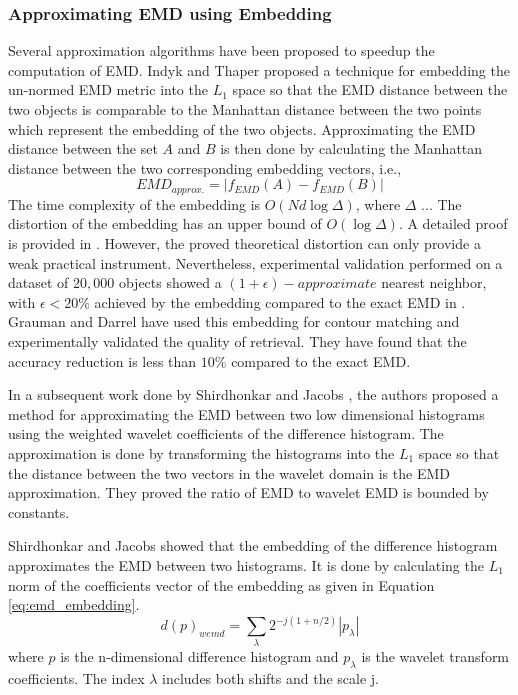 \documentclass[10pt, conference, compsocconf]{IEEEtran}
\theoremstyle{definition}
\begin{document}
\subsubsection{Approximating EMD using Embedding}
\label{subsec:approximating_emd_using_embedding}
Several approximation algorithms have been proposed to speedup the computation of EMD. 
Indyk and Thaper \cite{indyk2003fast} proposed a technique for embedding the un-normed EMD metric into the $L_1$ space so that the EMD distance between the two objects is comparable to the Manhattan distance between the two points which represent the embedding of the two objects.
Approximating the EMD distance between the set $A$ and $B$ is then done by calculating the Manhattan distance between the two corresponding embedding vectors, i.e.,
\begin{equation}
EMD_{approx.}=|f_{EMD}(A) - f_{EMD}(B)|
\end{equation}  
The time complexity of the embedding is $O(Nd \log{\Delta})$, where $\Delta$ ...
The distortion of the embedding has an upper bound of $O(\log \Delta)$. 
A detailed proof is provided in \cite{indyk2003fast}.
However, the proved theoretical distortion can only provide a weak practical instrument. 
Nevertheless, experimental validation performed on a dataset of $20,000$ objects showed a $(1+\epsilon)-approximate$ nearest neighbor, with $\epsilon < 20\%$ achieved by the embedding compared to the exact EMD in \cite{indyk2003fast}. Grauman and Darrel \cite{grauman2004fast} have used this embedding for contour matching and experimentally validated the quality of retrieval. 
They have found that the accuracy reduction is less than $10\%$ compared to the exact EMD.

In a subsequent work done by Shirdhonkar and Jacobs \cite{shirdhonkar2008approximate}, the authors proposed a method for approximating the EMD between two low dimensional histograms using the weighted wavelet coefficients of the difference histogram. 
The approximation is done by transforming the histograms into the $L_1$ space so that the distance between the two vectors in the wavelet domain is the EMD approximation. 
They proved the ratio of EMD to wavelet EMD is bounded by constants. 

Shirdhonkar and Jacobs showed that the embedding of the difference histogram approximates the EMD between two histograms. It is done by calculating the $L_1$ norm of the coefficients vector of the embedding as given in Equation \ref{eq:emd_embedding}.
\begin{equation}
d(p)_{wemd}= \sum\limits_{\lambda} 2^{-j(1+n/2)}|p_{\lambda}|
\label{eq:emd_embedding}
\end{equation}
where $p$ is the n-dimensional difference histogram and $p_{\lambda}$ is the wavelet transform coefficients. 
The index $\lambda$ includes both shifts and the scale j.
\end{document}
